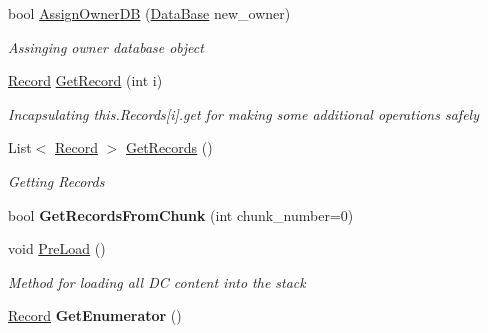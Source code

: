 \begin{DoxyCompactItemize}
bool \hyperlink{class_dwarf_d_b_1_1_data_structures_1_1_data_container_aeac4bb0b67fdcba42ea4933a03f295c3}{Assign\+Owner\+D\+B} (\hyperlink{class_dwarf_d_b_1_1_data_structures_1_1_data_base}{Data\+Base} new\+\_\+owner)
\begin{DoxyCompactList}\small\item\em Assinging owner database object \end{DoxyCompactList}\item 
\hyperlink{class_dwarf_d_b_1_1_data_structures_1_1_record}{Record} \hyperlink{class_dwarf_d_b_1_1_data_structures_1_1_data_container_afdcd349b09fa679ea11d0a04e073e965}{Get\+Record} (int i)
\begin{DoxyCompactList}\small\item\em Incapsulating this.\+Records\mbox{[}i\mbox{]}.get for making some additional operations safely \end{DoxyCompactList}\item 
List$<$ \hyperlink{class_dwarf_d_b_1_1_data_structures_1_1_record}{Record} $>$ \hyperlink{class_dwarf_d_b_1_1_data_structures_1_1_data_container_ab9691aa5445b0069bb30c4d7a9f6139c}{Get\+Records} ()
\begin{DoxyCompactList}\small\item\em Getting Records \end{DoxyCompactList}\item 
\hypertarget{class_dwarf_d_b_1_1_data_structures_1_1_data_container_ad72368f523f462dd3baee29e6ba4da66}{bool {\bfseries Get\+Records\+From\+Chunk} (int chunk\+\_\+number=0)}\label{class_dwarf_d_b_1_1_data_structures_1_1_data_container_ad72368f523f462dd3baee29e6ba4da66}

\item 
void \hyperlink{class_dwarf_d_b_1_1_data_structures_1_1_data_container_adb2c609dd0c1c9230ac94454a6db723f}{Pre\+Load} ()
\begin{DoxyCompactList}\small\item\em Method for loading all D\+C content into the stack \end{DoxyCompactList}\item 
\hypertarget{class_dwarf_d_b_1_1_data_structures_1_1_data_container_aaea9c8cb3180484e56d0f6b47f90b23c}{\hyperlink{class_dwarf_d_b_1_1_data_structures_1_1_record}{Record} {\bfseries Get\+Enumerator} ()}\label{class_dwarf_d_b_1_1_data_structures_1_1_data_container_aaea9c8cb3180484e56d0f6b47f90b23c}


\end{DoxyCompactItemize}
